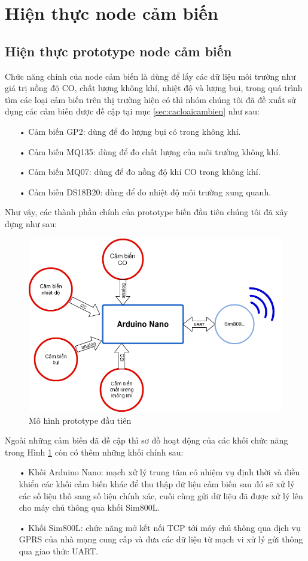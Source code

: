 \newpage

\section{Hiện thực node cảm biến}
\subsection{Hiện thực prototype node cảm biến}
Chức năng chính của node cảm biến là dùng để lấy các dữ liệu môi trường như giá trị nồng độ CO, chất lượng không khí, nhiệt độ và lượng bụi, trong quá trình tìm các loại cảm biến trên thị trường hiện có thì nhóm chúng tôi đã đề xuất sử dụng các cảm biến được đề cập tại mục \ref{sec:cacloaicambien} như sau:
\begin{itemize}
\item[•]Cảm biến GP2: dùng để đo lượng bụi có trong không khí.
\item[•]Cảm  biến MQ135: dùng để đo chất lượng của môi trường không khí.
\item[•]Cảm biến MQ07: dùng để đo nồng độ khí CO trong không khí.
\item[•]Cảm biến DS18B20: dùng để đo nhiệt độ môi trường xung quanh. 
\end{itemize}
Như vậy, các thành phần chính của prototype biến đầu tiên chúng tôi đã xây dựng như sau:
\begin{figure}[H]
\centering    
\includegraphics[width=5in]{prototype_1}
\caption[Mô hình prototype đầu tiên]{Mô hình prototype đầu tiên}
\label{fig:prototype_1}
\end{figure}
Ngoài những cảm biến đã đề cập thì sơ đồ hoạt động của các khối chức năng trong Hình \ref{fig:prototype_1} còn có thêm những khối chính sau:
\begin{itemize}
\item[•] Khối Arduino Nano: mạch xử lý trung tâm có nhiệm vụ định thời và điều khiển các khối cảm biến khác để thu thập dữ liệu cảm biến sau đó sẽ xử lý các số liệu thô sang số liệu chính xác, cuối cùng gửi dữ liệu đã được xử lý lên cho máy chủ thông qua khối Sim800L.
\item[•] Khối Sim800L: chức năng mở kết nối TCP tới máy chủ thông qua dịch vụ GPRS của nhà mạng cung cấp và đưa các dữ liệu từ mạch vi xử lý gửi thông qua giao thức UART.
\end{itemize}



